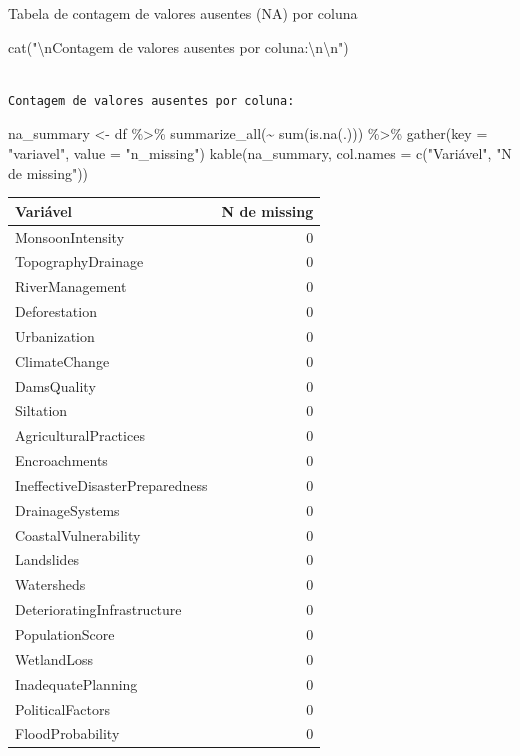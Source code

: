 \documentclass[
  letterpaper,
  DIV=11,
  numbers=noendperiod]{scrartcl}
\newenvironment{Shaded}{\begin{snugshade}}{\end{snugshade}}
\newcommand{\AttributeTok}[1]{\textcolor[rgb]{0.40,0.45,0.13}{#1}}
\newcommand{\FunctionTok}[1]{\textcolor[rgb]{0.28,0.35,0.67}{#1}}
\newcommand{\NormalTok}[1]{\textcolor[rgb]{0.00,0.23,0.31}{#1}}
\newcommand{\OtherTok}[1]{\textcolor[rgb]{0.00,0.23,0.31}{#1}}
\newcommand{\SpecialCharTok}[1]{\textcolor[rgb]{0.37,0.37,0.37}{#1}}
\newcommand{\StringTok}[1]{\textcolor[rgb]{0.13,0.47,0.30}{#1}}
\begin{document}
Tabela de contagem de valores ausentes (NA) por coluna

\begin{Shaded}
\begin{Highlighting}[]
\FunctionTok{cat}\NormalTok{(}\StringTok{"}\SpecialCharTok{\textbackslash{}n}\StringTok{Contagem de valores ausentes por coluna:}\SpecialCharTok{\textbackslash{}n\textbackslash{}n}\StringTok{"}\NormalTok{)}
\end{Highlighting}
\end{Shaded}

\begin{verbatim}

Contagem de valores ausentes por coluna:
\end{verbatim}

\begin{Shaded}
\begin{Highlighting}[]
\NormalTok{na\_summary }\OtherTok{\textless{}{-}}\NormalTok{ df }\SpecialCharTok{\%\textgreater{}\%}
  \FunctionTok{summarize\_all}\NormalTok{(}\SpecialCharTok{\textasciitilde{}} \FunctionTok{sum}\NormalTok{(}\FunctionTok{is.na}\NormalTok{(.))) }\SpecialCharTok{\%\textgreater{}\%}
  \FunctionTok{gather}\NormalTok{(}\AttributeTok{key =} \StringTok{"variavel"}\NormalTok{, }\AttributeTok{value =} \StringTok{"n\_missing"}\NormalTok{)}
\FunctionTok{kable}\NormalTok{(na\_summary, }\AttributeTok{col.names =} \FunctionTok{c}\NormalTok{(}\StringTok{"Variável"}\NormalTok{, }\StringTok{"N de missing"}\NormalTok{))}
\end{Highlighting}
\end{Shaded}

\begin{longtable}[]{@{}lr@{}}
\toprule\noalign{}
Variável & N de missing \\
\midrule\noalign{}
\endhead
\bottomrule\noalign{}
\endlastfoot
MonsoonIntensity & 0 \\
TopographyDrainage & 0 \\
RiverManagement & 0 \\
Deforestation & 0 \\
Urbanization & 0 \\
ClimateChange & 0 \\
DamsQuality & 0 \\
Siltation & 0 \\
AgriculturalPractices & 0 \\
Encroachments & 0 \\
IneffectiveDisasterPreparedness & 0 \\
DrainageSystems & 0 \\
CoastalVulnerability & 0 \\
Landslides & 0 \\
Watersheds & 0 \\
DeterioratingInfrastructure & 0 \\
PopulationScore & 0 \\
WetlandLoss & 0 \\
InadequatePlanning & 0 \\
PoliticalFactors & 0 \\
FloodProbability & 0 \\
\end{longtable}
\end{document}
